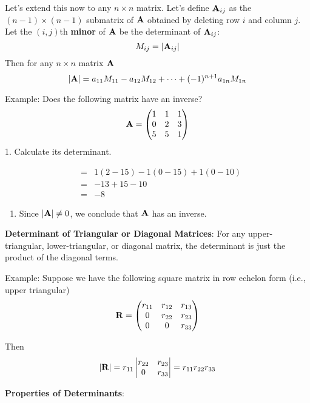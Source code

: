 \documentclass[]{book}
\providecommand{\tightlist}{%
  \setlength{\itemsep}{0pt}\setlength{\parskip}{0pt}}
\theoremstyle{definition}
\theoremstyle{definition}
\theoremstyle{definition}
\theoremstyle{remark}
\begin{document}
Let's extend this now to any \(n\times n\) matrix. Let's define
\({\bf A}_{ij}\) as the \((n-1)\times (n-1)\) submatrix of \({\bf A}\)
obtained by deleting row \(i\) and column \(j\). Let the \((i,j)\)th
\textbf{minor} of \({\bf A}\) be the determinant of \({\bf A}_{ij}\):
\[M_{ij}=|{\bf A}_{ij}|\] Then for any \(n\times n\) matrix \({\bf A}\)
\[|{\bf A}|= a_{11}M_{11} - a_{12}M_{12} + \cdots + (-1)^{n+1} a_{1n} M_{1n}\]

Example: Does the following matrix have an inverse?
\[{\bf A}=\begin{pmatrix} 1&1&1\\0&2&3\\5&5&1 \end{pmatrix}\] 1.
Calculate its determinant.

\begin{eqnarray}
                &=& 1(2-15) - 1(0-15) + 1(0-10) \nonumber\\
                &=& -13+15-10 \nonumber\\
                &=& -8\nonumber
\end{eqnarray}

\begin{enumerate}
\def\labelenumi{\arabic{enumi}.}
\setcounter{enumi}{1}
\tightlist
\item
  Since \(|{\bf A}|\ne 0\), we conclude that \({\bf A}\) has an inverse.
\end{enumerate}

\textbf{Determinant of Triangular or Diagonal Matrices}: For any
upper-triangular, lower-triangular, or diagonal matrix, the determinant
is just the product of the diagonal terms.

Example: Suppose we have the following square matrix in row echelon form
(i.e., upper triangular)
\[{\bf R} =\begin{pmatrix} r_{11}&r_{12}&r_{13}\\
            0&r_{22}&r_{23}\\
            0&     0&r_{33} \end{pmatrix}\]

Then
\[|{\bf R}| = r_{11} \begin{vmatrix} r_{22}&r_{23}\\ 0&r_{33} \end{vmatrix} = r_{11}r_{22}r_{33}\]

\textbf{Properties of Determinants}:
\end{document}
